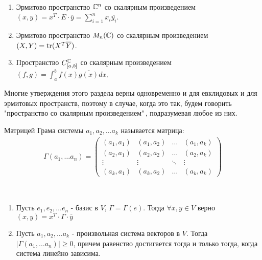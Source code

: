 \begin{example}~
    \begin{enumerate}
        \item Эрмитово пространство $\mathbb{C}^n$ со скалярным произведением 
        $(x, y) = x^T \cdot E \cdot \overline{y} = \displaystyle\sum_{i=1}^{n} x_i \overline{y_i}$.
        \item Эрмитово пространство $M_n(\mathbb{C})$ со скалярным произведением $(X, Y) = \operatorname{tr} (X^T \overline{Y})$.
        \item Пространство $C_{[a, b]}^{\mathbb{C}}$ со скалярным произведением $(f, g) = \int_{a}^{b} f(x) \overline{g(x)} dx$.
    \end{enumerate}
\end{example}

\begin{note}
    Многие утверждения этого раздела верны одновременно и для евклидовых и для эрмитовых пространств,
    поэтому в случае, когда это так, будем говорить "пространство со скалярным произведением"\,, подразумевая 
    любое из них.
\end{note}

\begin{definition}
    Матрицей Грама системы $a_1, a_2, \dots a_k$ называется матрица: 
    \begin{gather*}
        \Gamma(a_1, \dots a_n) = \begin{pmatrix}
        (a_1, a_1)      & (a_1, a_2)      & \dots  & (a_1, a_k)        \\
        (a_2, a_1)      & (a_2, a_2)      & \dots  & (a_2, a_k)        \\
        \vdots & \vdots & \ddots & \vdots   \\
        (a_k, a_1)      & (a_k, a_2)      & \dots  & (a_k, a_k)
        \end{pmatrix}
    \end{gather*}
\end{definition}

\begin{theorem}~
    \label{th11.1}
    \begin{enumerate}
        \item
        Пусть $e_1, e_2, \dots e_n$ - базис в $V$, $\Gamma = \Gamma(e)$. Тогда $\forall x, y \in V$ верно 
        $(x, y) = x^T \cdot \Gamma \cdot \overline{y}$
        \item Пусть $a_1, a_2, \dots a_k$ - произвольная система векторов в $V$. Тогда $|\Gamma(a_1, \dots a_n)| \geq 0$, 
        причем равенство достигается тогда и только тогда, когда система линейно зависима.
    \end{enumerate}
\end{theorem}


